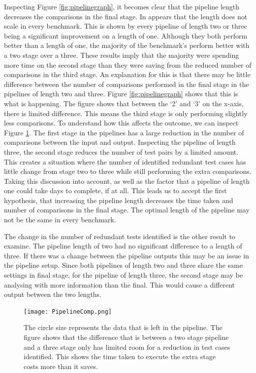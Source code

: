 Inspecting Figure \ref{fig:pipelinegraph}, it becomes clear that the pipeline length decreases the comparisons in the final stage. In appears that the length does not scale in every benchmark. This is shown by every pipeline of length two or three being a significant improvement on a length of one. Although they both perform better than a length of one, the majority of the benchmark's perform better with a two stage over a three. These results imply that the majority were spending more time on the second stage than they were saving from the reduced number of comparisons in the third stage. An explanation for this is that there may be little difference between the number of comparisons performed in the final stage in the pipelines of length two and three. Figure \ref{fig:pipelinegraph} shows that this is what is happening. The figure shows that between the `2' and `3' on the x-axis, there is limited difference. This means the third stage is only performing slightly less comparisons. To understand how this affects the outcome, we can inspect Figure \ref{fig:pipelinecomp}. The first stage in the pipelines has a large reduction in the number of comparisons between the input and output. Inspecting the pipeline of length three, the second stage reduces the number of test pairs by a limited amount. This creates a situation where the number of identified redundant test cases has little change from stage two to three while still performing the extra comparisons. Taking this discussion into account, as well as the factor that a pipeline of length one could take days to complete, if at all. This leads us to accept the first hypothesis, that increasing the pipeline length decreases the time taken and number of comparisons in the final stage. The optimal length of the pipeline may not be the same in every benchmark.

The change in the number of redundant tests identified is the other result to examine. The pipeline length of two had no significant difference to a length of three. If there was a change between the pipeline outputs this may be an issue in the pipeline setup. Since both pipelines of length two and three share the same settings in final stage, for the pipeline of length three, the second stage may be analysing with more information than the final. This would cause a different output between the two lengths.

\begin{figure}[h]
\centering
\texttt{[image: PipelineComp.png]}
\caption[A figure showing the differences between a pipeline of length two and three]{The circle size represents the data that is left in the pipeline. The figure shows that the difference that is between a two stage pipeline and a three stage only has limited room for a reduction in test cases identified. This shows the time taken to execute the extra stage costs more than it saves. }
\label{fig:pipelinecomp}
\end{figure}


